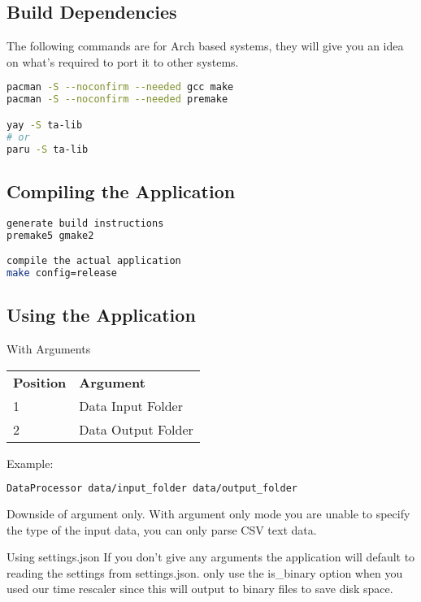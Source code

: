 \documentclass[12pt,a4paper]{article}
\begin{document}
\subsection{Build Dependencies}

The following commands are for Arch based systems, they will give you an idea on what's required to port it to other systems.

\begin{lstlisting}[language=bash]
pacman -S --noconfirm --needed gcc make
pacman -S --noconfirm --needed premake

yay -S ta-lib
# or
paru -S ta-lib
\end{lstlisting}

\subsection{Compiling the Application}

\begin{lstlisting}[language=bash]
generate build instructions
premake5 gmake2

compile the actual application
make config=release
\end{lstlisting}

\subsection{Using the Application}

With Arguments
\begin{table}[H]
\begin{tabular}{ll}
\textbf{Position} & \textbf{Argument}  \\
1                 & Data Input Folder  \\
2                 & Data Output Folder
\end{tabular}
\end{table}

Example:
\begin{lstlisting}[language=bash]
DataProcessor data/input_folder data/output_folder
\end{lstlisting}

Downside of argument only.
With argument only mode you are unable to specify the type of the input data, you can only parse CSV text data.

Using settings.json
If you don't give any arguments the application will default to reading the settings from settings.json. only use the is\_binary option when you used our time rescaler since this will output to binary files to save disk space.
\end{document}
